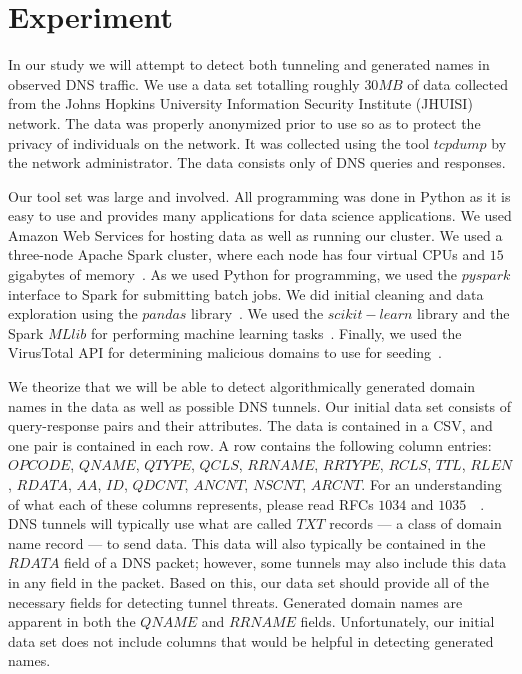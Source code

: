 \section{Experiment}

In our study we will attempt to detect both tunneling and generated names in observed DNS traffic.
We use a data set totalling roughly $30 MB$ of data collected from the Johns Hopkins
University Information Security Institute (JHUISI) network.
The data was properly anonymized prior to use so as to protect the privacy of individuals on the network.
It was collected using the tool $tcpdump$ by the network administrator.
The data consists only of DNS queries and responses.

Our tool set was large and involved.
All programming was done in Python as it is easy to use and provides many applications for data
science applications.
We used Amazon Web Services for hosting data as well as running our cluster.
We used a three-node Apache Spark cluster, where each node has four virtual CPUs and $15$ gigabytes
of memory~\cite{spark}.
As we used Python for programming, we used the $pyspark$ interface to Spark for submitting batch jobs.
We did initial cleaning and data exploration using the $pandas$ library~\cite{pandas}.
We used the $scikit-learn$ library and the Spark $MLlib$ for performing machine learning tasks~\cite{scikit}.
Finally, we used the VirusTotal API for determining malicious domains to use for seeding~\cite{vt}.

We theorize that we will be able to detect algorithmically generated domain names in the data as
well as possible DNS tunnels.
Our initial data set consists of query-response pairs and their attributes.
The data is contained in a CSV, and one pair is contained in each row.
A row contains the following column entries: $OPCODE$, $QNAME$, $QTYPE$, $QCLS$, $RRNAME$, $RRTYPE$,
$RCLS$, $TTL$, $RLEN$, $RDATA$, $AA$, $ID$, $QDCNT$, $ANCNT$, $NSCNT$, $ARCNT$.
For an understanding of what each of these columns represents, please read RFCs $1034$ and $1035$~\cite{rfc1034}~\cite{rfc1035}.
DNS tunnels will typically use what are called $TXT$ records --- a class of domain name record ---
to send data.
This data will also typically be contained in the $RDATA$ field of a DNS packet; however, some
tunnels may also include this data in any field in the packet.
Based on this, our data set should provide all of the necessary fields for detecting tunnel threats.
Generated domain names are apparent in both the $QNAME$ and $RRNAME$ fields.
Unfortunately, our initial data set does not include columns that would be helpful in detecting
generated names.

